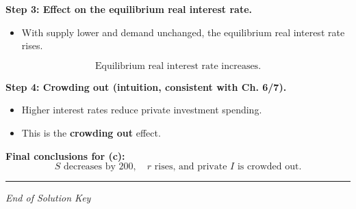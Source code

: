 \documentclass[12pt]{article}
\begin{document}
\textbf{Step 3: Effect on the equilibrium real interest rate.}
\begin{itemize}
    \item With supply lower and demand unchanged, the equilibrium real interest rate rises.
\end{itemize}
\[
\boxed{\text{Equilibrium real interest rate increases.}}
\]

\textbf{Step 4: Crowding out (intuition, consistent with Ch. 6/7).}
\begin{itemize}
    \item Higher interest rates reduce private investment spending.
    \item This is the \textbf{crowding out} effect.
\end{itemize}

\textbf{Final conclusions for (c):}
\[
\boxed{S \text{ decreases by } 200,\quad r \text{ rises, and private } I \text{ is crowded out.}}
\]

\hrule
\vspace{1em}

\begin{center}
\textit{End of Solution Key}
\end{center}
\end{document}
